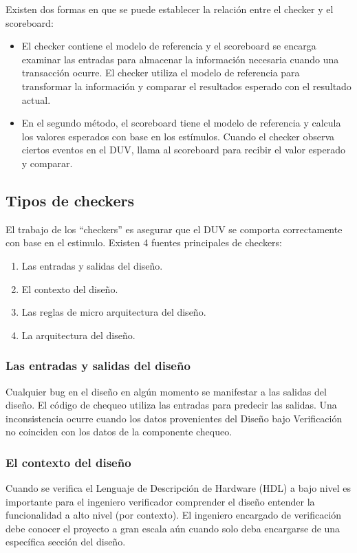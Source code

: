 Existen dos formas en que se puede establecer la relación entre el checker y el scoreboard:
\begin{itemize}
\item El checker contiene el modelo de referencia y el scoreboard se encarga examinar las entradas para
almacenar la información necesaria cuando una transacción ocurre. El checker utiliza el modelo de referencia para transformar la información y comparar el resultados esperado con el resultado actual.
\item En el segundo método, el scoreboard tiene el modelo de referencia y calcula los valores esperados con base en los estímulos. Cuando el checker observa ciertos eventos en el DUV, llama al scoreboard para recibir el valor esperado y comparar.
\end{itemize}

\subsection{Tipos de checkers}

El trabajo de los “checkers” es asegurar que el DUV se comporta correctamente con base en el estimulo. Existen 4 fuentes principales de checkers:
\begin{enumerate}
\item Las entradas y salidas del diseño.
\item El contexto del diseño.
\item Las reglas de micro arquitectura del diseño.
\item La arquitectura del diseño.
\end{enumerate}


\subsubsection{Las entradas y salidas del diseño} 

Cualquier bug en el diseño en algún momento se manifestar a las salidas del diseño. El código de chequeo utiliza las entradas para predecir las salidas. Una inconsistencia ocurre cuando los datos provenientes del  Diseño bajo Verificación no coinciden con los datos de la componente chequeo. 

\subsubsection{El contexto del diseño} 

Cuando se verifica el Lenguaje de Descripción de Hardware (HDL) a bajo nivel es importante para el ingeniero verificador comprender el diseño entender la funcionalidad a alto nivel (por contexto). El ingeniero encargado de verificación debe conocer el proyecto a gran escala aún cuando solo deba encargarse de una específica sección del diseño.

